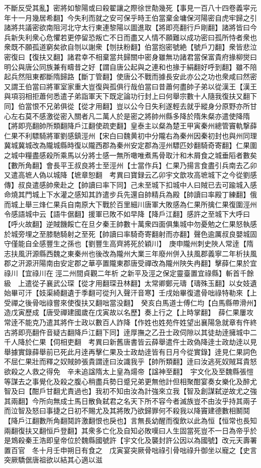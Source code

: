 不斷反受其亂】密將如黎陽或曰殺翟讓之際徐世勣幾死【事見一百八十四卷義寜元年十一月幾居希翻】今失利而就之安可保乎時王伯當棄金墉保河陽密自虎牢歸之引諸將共議密欲南阻河北守太行東連黎陽以圖進取【將即亮翻行戶剛翻】諸將皆曰今兵新失利衆心危懼若更停留恐叛亡不日而盡又人情不願難以成功密曰孤所恃者衆也衆既不願孤道窮矣欲自刎以謝衆【刎扶粉翻】伯當抱密號絶【號戶刀翻】衆皆悲泣密復曰【復扶又翻】諸君幸不相棄當共歸關中密身雖無功諸君當保富貴府掾柳爕曰明公與唐公同族兼有疇昔之好【謂自唐公起與之連和也掾于絹翻好呼到翻】雖不陪起兵然阻東都斷隋歸路【斷丁管翻】使唐公不戰而據長安此亦公之功也衆咸曰然密又謂王伯當曰將軍室家重大豈復與孤俱行哉伯當曰昔蕭何盡帥子弟以從漢王【漢王與項羽相拒蕭何悉遣子弟詣軍天下既定論功行封上曰何舉宗數十人隨我復扶又翻下同】伯當恨不兄弟俱從【從才用翻】豈以公今日失利遂輕去就乎縱身分原野亦所甘心左右莫不感激從密入關者凡二萬人於是密之將帥州縣多降於隋朱粲亦遣使降隋【將即亮翻帥所類翻降戶江翻使疏吏翻】皇泰主以粲為楚王甲寅秦州總管竇軌撃薛仁果不利驃騎將軍劉感鎮涇州【宋白曰魏黄初中分隴右為秦州因秦初封也與州同理冀城冀城改為隴城縣時復以隴西郡為秦州安定郡為涇州驃匹妙翻騎奇寄翻】仁果圍之城中糧盡感殺所乘馬以分將士感一無所噉唯煮馬骨取汁和木屑食之城垂䧟者數矣【數所角翻】會長平王叔良將士至涇州【士當作兵】仁果乃揚言食盡引兵南去乙卯又遣高墌人偽以城降【墌章恕翻　考異曰寶録云乙卯宇文歆攻高墌城下之今從劉感傳】叔良遣感帥衆赴之【帥讀曰率下同】己未至城下扣城中人曰賊已去可踰城入感命燒其門城上下水灌之感知其詐遣步兵先還自帥精兵為殿【帥讀曰率殿丁練翻】俄而城上舉三烽仁果兵自南原大下戰於百里細川唐軍大敗感為仁果所擒仁果復圍涇州令感語城中云【語牛倨翻】援軍已敗不如早降【降戶江翻】感許之至城下大呼曰【呼火故翻】逆賊饑餒亡在旦夕秦王帥數十萬衆四面俱集城中勿憂勉之仁果怒執感於城旁埋之至膝馳騎射之至死【帥讀曰率騎奇寄翻射而亦翻】聲色逾厲叔良嬰城固守僅能自全感豐生之孫也【劉豐生高齊將死於穎川】　庚申隴州刺史陜人常逹【隋志扶風汧源縣西魏之東秦州也後改為隴州大業三年廢州併入扶風郡義寧二年析扶風郡之汧源汧陽南由安定郡之華亭置隴東郡唐受禪改為隴州陜失冉翻】擊薛仁果於宜祿川【宜祿川在涇二州間貞觀二年析之新平及涇之保定靈臺置宜祿縣】斬首千餘級　上遣從子襄武公琛【從才用翻琛丑林翻】太常卿鄭元璹【璹殊玉翻】以女妓遺始畢可汗【妓渠綺翻遺于季翻可從刋入聲汗音寒】壬戌始畢復遣骨咄祿特勒來【上受禪之後骨咄祿嘗來使復扶又翻咄當没翻】　癸亥白馬道士傅仁均【白馬縣帶滑州】造戊寅歷成【唐受禪建國歲在戊寅故以名歷】奏上行之【上時掌翻】　薛仁果屢攻常逹不能克乃遣其將仵士政以數百人詐降【作姓也姓苑仵姓望出襄陽急就章有仵終古將即亮翻仵音疑古翻降戶江翻下同】逹厚撫之乙丑士政伺隙以其徒劫逹擁城中二千人降於仁果【伺相吏翻　考異曰新舊唐書皆云薛舉遣仵士政偽降逹士政劫逹以見舉據實錄薛舉前已死此月逹再擊仁果及士政劫逹皆有日月今從實錄】逹見仁果詞色不屈仁果壯而釋之奴賊帥張貴謂逹曰汝識我乎【帥所類翻】逹曰汝逃死奴賊耳貴怒欲殺之人救之得免　辛未追諡隋太上皇為煬帝【諡神至翻】　宇文化及至魏縣張愷等謀去之事覺化及殺之腹心稍盡兵勢日蹙兄弟更無他計但相聚酣宴奏女樂化及醉尤智及曰【酣戶甘翻尤責過也】我初不知由汝為計強來立我【智及創謀弑逆故尤之強其兩翻】今所向無成士馬日散負弑君之名天下所不容今者滅族豈不由汝乎持其兩子而泣智及怒曰事捷之日初不賜尤及其將敗乃欲歸罪何不殺我以降竇建德數相鬭鬩【降戶江翻數所角翻鬩許激翻恨也戾也】言無長幼醒而復飲以此為恒【恒常也長知兩翻復扶又翻恒戶登翻】其衆多亡化及自知必敗嘆曰人生固當死豈不一日為帝乎於是鴆殺秦王浩即皇帝位於魏縣國號許【宇文化及襲封許公因以為國號】改元天壽署置百官　冬十月壬申朔日有食之　戊寅宴突厥骨咄祿引骨咄祿升御坐以寵之【史言突厥驕倨唐祖欲以結其心適以滋
